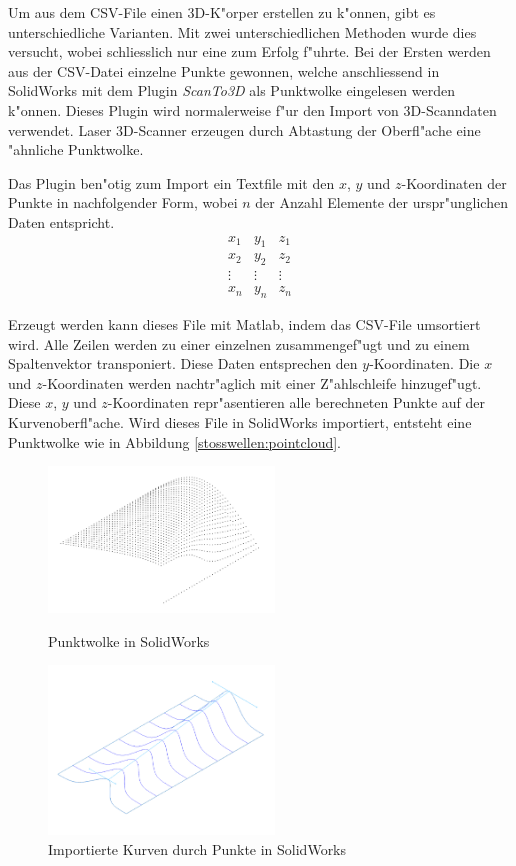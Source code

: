 \begin{refsection}
Um aus dem CSV-File einen 3D-K"orper erstellen zu k"onnen, gibt es
unterschiedliche Varianten. Mit zwei unterschiedlichen Methoden wurde dies
versucht, wobei schliesslich nur eine zum Erfolg f"uhrte. Bei der Ersten
werden aus der CSV-Datei einzelne Punkte gewonnen, welche anschliessend
in SolidWorks mit dem Plugin \textit{ScanTo3D} als Punktwolke eingelesen
werden k"onnen. Dieses Plugin wird normalerweise f"ur den Import von
3D-Scanndaten verwendet. Laser 3D-Scanner erzeugen durch Abtastung der
Oberfl"ache eine "ahnliche Punktwolke. 

Das Plugin ben"otig zum Import ein Textfile mit den $x$, $y$ und
$z$-Koordinaten der Punkte in nachfolgender Form, wobei $n$ der Anzahl
Elemente der urspr"unglichen Daten entspricht.
\begin{equation}
	\begin{matrix}
		x_{1}		& y_{1}		& z_{1} \\
		x_{2}		& y_{2}		& z_{2}	\\
		\vdots 		& \vdots	& \vdots\\
		x_{n}		& y _{n}	& z_{n}
	\end{matrix}
\end{equation} 

Erzeugt werden kann dieses File mit Matlab, indem das CSV-File
umsortiert wird. Alle Zeilen werden zu einer einzelnen zusammengef"ugt
und zu einem Spaltenvektor transponiert. Diese Daten entsprechen den
$y$-Koordinaten. Die $x$ und $z$-Koordinaten werden nachtr"aglich mit
einer Z"ahlschleife hinzugef"ugt. Diese $x$, $y$ und $z$-Koordinaten
repr"asentieren alle berechneten Punkte auf der Kurvenoberfl"ache. Wird
dieses File in SolidWorks importiert, entsteht eine Punktwolke wie in
Abbildung \ref*{stosswellen:pointcloud}.
\begin{figure}
\begin{minipage}{0.45\textwidth}
	\includegraphics[width=6cm]{stosswellen/pointCloud.PNG}
	\caption{Punktwolke in SolidWorks}
\label{stosswellen:pointcloud}
\end{minipage}
\hfill
\begin{minipage}{0.45\textwidth}
	\includegraphics[width=6cm]{stosswellen/importedCurves.PNG}
	\caption{Importierte Kurven durch Punkte in SolidWorks}
	\label{stosswellen:importedCurves}
\end{minipage}
\end{figure}


\end{refsection}
